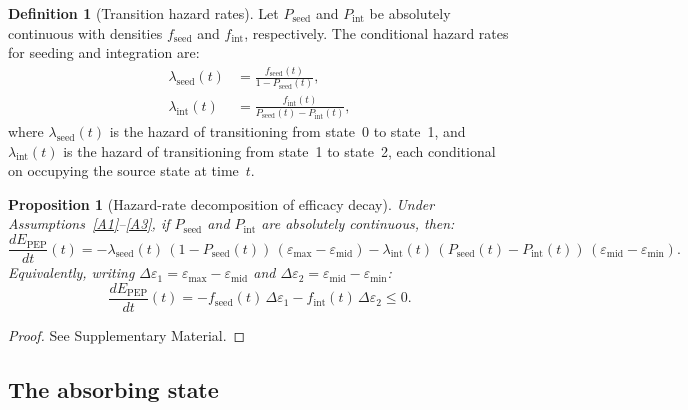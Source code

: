 \documentclass[12pt,a4paper]{article}
\theoremstyle{plain}
\newtheorem{proposition}[theorem]{Proposition}
\theoremstyle{definition}
\newtheorem{definition}[theorem]{Definition}
\theoremstyle{remark}
\newcommand{\Pint}{P_{\mathrm{int}}}
\newcommand{\Pseed}{P_{\mathrm{seed}}}
\newcommand{\Epep}{E_{\mathrm{PEP}}}
\newcommand{\lseed}{\lambda_{\mathrm{seed}}}
\newcommand{\lint}{\lambda_{\mathrm{int}}}
\begin{document}
\begin{definition}[Transition hazard rates]\label{def:hazard}
Let $\Pseed$ and $\Pint$ be absolutely continuous with densities $f_{\mathrm{seed}}$ and $f_{\mathrm{int}}$, respectively. The conditional hazard rates for seeding and integration are:
\begin{align}
    \lseed(t) &= \frac{f_{\mathrm{seed}}(t)}{1 - \Pseed(t)}, \label{eq:hazard-seed}\\
    \lint(t) &= \frac{f_{\mathrm{int}}(t)}{\Pseed(t) - \Pint(t)}, \label{eq:hazard-int}
\end{align}
where $\lseed(t)$ is the hazard of transitioning from state~0 to state~1, and $\lint(t)$ is the hazard of transitioning from state~1 to state~2, each conditional on occupying the source state at time~$t$.
\end{definition}

\begin{proposition}[Hazard-rate decomposition of efficacy decay]\label{prop:hazard}
Under Assumptions~\ref{A1}--\ref{A3}, if $\Pseed$ and $\Pint$ are absolutely continuous, then:
\begin{equation}\label{eq:dEdt}
    \frac{d\Epep}{dt}(t) = -\lseed(t)\,(1 - \Pseed(t))\,(\varepsilon_{\max} - \varepsilon_{\mathrm{mid}}) - \lint(t)\,(\Pseed(t) - \Pint(t))\,(\varepsilon_{\mathrm{mid}} - \varepsilon_{\min}).
\end{equation}
Equivalently, writing $\Delta\varepsilon_1 = \varepsilon_{\max} - \varepsilon_{\mathrm{mid}}$ and $\Delta\varepsilon_2 = \varepsilon_{\mathrm{mid}} - \varepsilon_{\min}$:
\begin{equation}\label{eq:dEdt-compact}
    \frac{d\Epep}{dt}(t) = -f_{\mathrm{seed}}(t)\,\Delta\varepsilon_1 - f_{\mathrm{int}}(t)\,\Delta\varepsilon_2 \leq 0.
\end{equation}
\end{proposition}

\begin{proof}
See Supplementary Material.
\end{proof}




\subsection{The absorbing state}\label{sec:absorbing}
\end{document}
